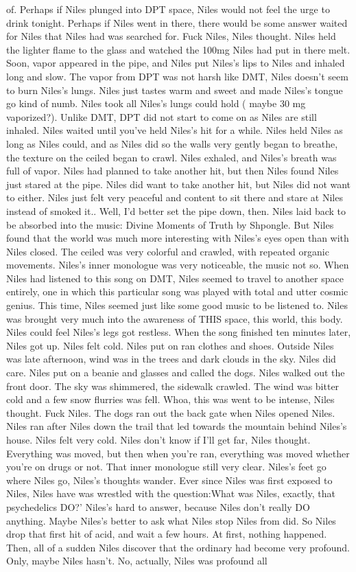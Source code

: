 \documentclass[12pt]{book}
\begin{document}
of. Perhaps if Niles plunged into DPT space, Niles would not feel the urge to drink tonight. Perhaps if Niles went in there, there would be some answer waited for Niles that Niles had was searched for. Fuck Niles, Niles thought. Niles held the lighter flame to the glass and watched the 100mg Niles had put in there melt. Soon, vapor appeared in the pipe, and Niles put Niles's lips to Niles and inhaled long and slow. The vapor from DPT was not harsh like DMT, Niles doesn't seem to burn Niles's lungs. Niles just tastes warm and sweet and made Niles's tongue go kind of numb. Niles took all Niles's lungs could hold ( maybe 30 mg vaporized?). Unlike DMT, DPT did not start to come on as Niles are still inhaled. Niles waited until you've held Niles's hit for a while. Niles held Niles as long as Niles could, and as Niles did so the walls very gently began to breathe, the texture on the ceiled began to crawl. Niles exhaled, and Niles's breath was full of vapor. Niles had planned to take another hit, but then Niles found Niles just stared at the pipe. Niles did want to take another hit, but Niles did not want to either. Niles just felt very peaceful and content to sit there and stare at Niles instead of smoked it.. Well, I'd better set the pipe down, then. Niles laid back to be absorbed into the music: Divine Moments of Truth by Shpongle. But Niles found that the world was much more interesting with Niles's eyes open than with Niles closed. The ceiled was very colorful and crawled, with repeated organic movements. Niles's inner monologue was very noticeable, the music not so. When Niles had listened to this song on DMT, Niles seemed to travel to another space entirely, one in which this particular song was played with total and utter cosmic genius. This time, Niles seemed just like some good music to be listened to. Niles was brought very much into the awareness of THIS space, this world, this body. Niles could feel Niles's legs got restless. When the song finished ten minutes later, Niles got up. Niles felt cold. Niles put on ran clothes and shoes. Outside Niles was late afternoon, wind was in the trees and dark clouds in the sky. Niles did care. Niles put on a beanie and glasses and called the dogs. Niles walked out the front door. The sky was shimmered, the sidewalk crawled. The wind was bitter cold and a few snow flurries was fell. Whoa, this was went to be intense, Niles thought. Fuck Niles. The dogs ran out the back gate when Niles opened Niles. Niles ran after Niles down the trail that led towards the mountain behind Niles's house. Niles felt very cold. Niles don't know if I'll get far, Niles thought. Everything was moved, but then when you're ran, everything was moved whether you're on drugs or not. That inner monologue still very clear. Niles's feet go where Niles go, Niles's thoughts wander. Ever since Niles was first exposed to Niles, Niles have was wrestled with the question:What was Niles, exactly, that psychedelics DO?' Niles's hard to answer, because Niles don't really DO anything. Maybe Niles's better to ask what Niles stop Niles from did. So Niles drop that first hit of acid, and wait a few hours. At first, nothing happened. Then, all of a sudden Niles discover that the ordinary had become very profound. Only, maybe Niles hasn't. No, actually, Niles was profound all 
\end{document}
